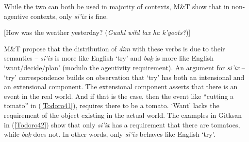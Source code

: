 \documentclass[output=paper]{langscibook}
\begin{document}
While the two can both be used in majority of contexts, M\&T show that in non-agentive contexts, only \emph{si’ix} is fine. 

\begin{exe}\judgewidth{\#}
\ex \label{Todoro40} [How was the weather yesterday? (\emph{Guuhl wihl lax ha k'yoots?})]
\begin{xlist}


\end{xlist}
\end{exe}

M\&T propose that the distribution of \emph{dim} with these verbs is due to their semantics -- \emph{si’ix} is more like English `try' and \emph{bak̲} is more like English `want/decide/plan’ (modulo the agentivity requirement). An argument for \emph{si’ix} -- ‘try’ correspondence builds on \citet{sharvit2003a} observation that ‘try’ has both an intensional and an extensional component. The extensional component asserts that there is an event in the real world. And if that is the case, then the event like ``cutting a tomato'' in (\ref{Todoro41}), requires there to be a tomato. ‘Want’ lacks the requirement of the object existing in the actual world. The examples in Gitksan in (\ref{Todoro42}) show that only \emph{si’ix} has a requirement that there are tomatoes, while \emph{bak̲} does not. In other words, only \emph{si’ix} behaves like English ‘try’.
\end{document}
